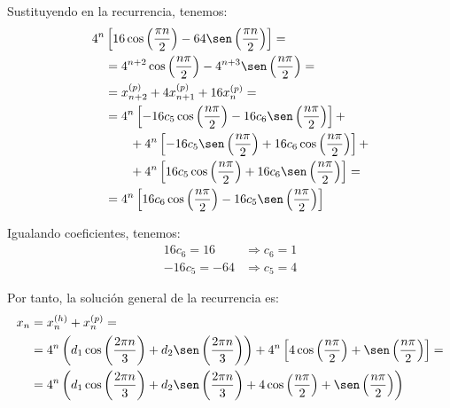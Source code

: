 \begin{ejercicio}
    Sustituyendo en la recurrencia, tenemos:
    \begin{align*}
        4^n & \left[16\cos\left(\frac{\pi n}{2}\right) - 64\sen\left(\frac{\pi n}{2}\right)\right] =\\
        &= 4^{n+2} \cos\left(\frac{n\pi}{2}\right) - 4^{n+3} \sen\left(\frac{n\pi}{2}\right) =\\
        &= x_{n+2}^{(p)} + 4x_{n+1}^{(p)} + 16x_n^{(p)} =\\
        &= 4^n\left[
            -16c_5\cos\left(\frac{n\pi}{2}\right) - 16c_6\sen\left(\frac{n\pi}{2}\right)    
        \right] +\\
        &\qquad + 4^n\left[
            -16c_5\sen\left(\frac{n\pi}{2}\right) + 16c_6\cos\left(\frac{n\pi}{2}\right)
        \right] +\\
        &\qquad + 4^n\left[
            16c_5\cos\left(\frac{n\pi}{2}\right) + 16c_6\sen\left(\frac{n\pi}{2}\right)
        \right] =\\
        &= 4^n\left[
            16c_6\cos\left(\frac{n\pi}{2}\right) - 16c_5\sen\left(\frac{n\pi}{2}\right)
        \right]
    \end{align*}

    Igualando coeficientes, tenemos:
    \begin{align*}
        16c_6 = 16 &\Longrightarrow c_6 = 1 \\
        -16c_5 = -64 &\Longrightarrow c_5 = 4
    \end{align*}

    Por tanto, la solución general de la recurrencia es:
    \begin{align*}
        x_n &= x_n^{(h)} + x_n^{(p)} =\\
        &= 4^n\left(d_1\cos\left(\frac{2\pi n}{3}\right) + d_2\sen\left(\frac{2\pi n}{3}\right)\right) + 4^n\left[4\cos\left(\frac{n\pi}{2}\right) + \sen\left(\frac{n\pi}{2}\right)\right] =\\
        &= 4^n\left(d_1\cos\left(\frac{2\pi n}{3}\right) + d_2\sen\left(\frac{2\pi n}{3}\right) + 4\cos\left(\frac{n\pi}{2}\right) + \sen\left(\frac{n\pi}{2}\right)\right)
    \end{align*}
\end{ejercicio}


